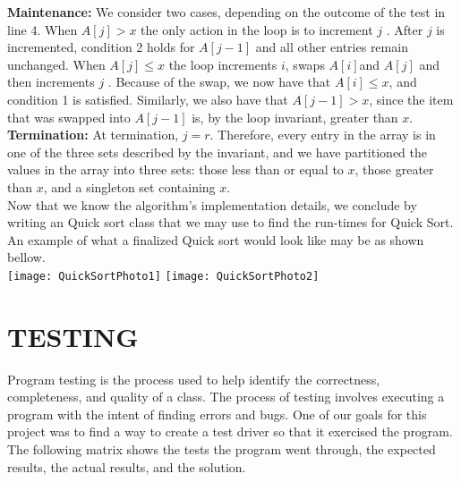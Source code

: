 \documentclass[12pt]{article}
\begin{document}
\textbf{Maintenance:} We consider two cases, depending on the outcome of the test in line 4. When $A[j]>x$ the only action in the loop is to increment $j$ . After $j$ is incremented, condition 2 holds for $A[j-1]$ and all other entries remain unchanged. When $A[j]\le x$ the loop increments $i$, swaps $A[i]$and $A[j]$ and then increments $j$ . Because of the swap, we now have that $A[i]\le x$, and condition 1 is satisfied. Similarly, we also have that $A[j-1]>x$, since the
item that was swapped into $A[j-1]$ is, by the loop invariant, greater than $x$.\\

\textbf{Termination:} At termination, $j = r$. Therefore, every entry in the array is in one of the three sets described by the invariant, and we have partitioned the values in the array into three sets: those less than or equal to $x$, those greater than $x$, and a singleton set containing $x$. \\

Now that we know the algorithm's implementation details, we conclude by writing an Quick sort class that we may use to find the run-times for Quick Sort. An example of what a finalized Quick sort would look like may be as shown bellow.\\

\texttt{[image: QuickSortPhoto1]}
\texttt{[image: QuickSortPhoto2]}

\pagebreak

\section*{TESTING}
Program testing is the process used to help identify the correctness, completeness, and quality of a class. The process of testing involves executing a program with the intent of finding errors and bugs. One of our goals for this project was to find a way to create a test driver so that it exercised the program. The following matrix shows the tests the program went through, the expected results, the actual results, and the solution. \\
\end{document}
